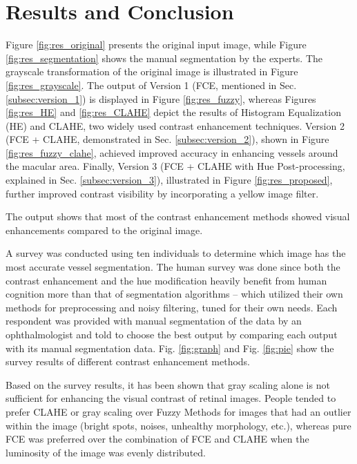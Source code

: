\section{Results and Conclusion}
\label{sec:results}

Figure \ref{fig:res_original} presents the original input image, while Figure \ref{fig:res_segmentation} shows the manual segmentation by the experts. The grayscale transformation of the original image is illustrated in Figure \ref{fig:res_grayscale}. The output of Version 1 (FCE, mentioned in Sec. \ref{subsec:version_1}) is displayed in Figure \ref{fig:res_fuzzy}, whereas Figures \ref{fig:res_HE} and \ref{fig:res_CLAHE} depict the results of Histogram Equalization (HE) and CLAHE, two widely used contrast enhancement techniques. Version 2 (FCE + CLAHE, demonstrated in Sec. \ref{subsec:version_2}), shown in Figure \ref{fig:res_fuzzy_clahe}, achieved improved accuracy in enhancing vessels around the macular area. Finally, Version 3 (FCE + CLAHE with Hue Post-processing, explained in Sec. \ref{subsec:version_3}), illustrated in Figure \ref{fig:res_proposed}, further improved contrast visibility by incorporating a yellow image filter.



The output shows that most of the contrast enhancement methods showed visual enhancements compared to the original image. 

A survey was conducted using ten individuals to determine which image has the most accurate vessel segmentation. The human survey was done since both the contrast enhancement and the hue modification heavily benefit from human cognition more than that of segmentation algorithms – which utilized their own methods for preprocessing and noisy filtering, tuned for their own needs. Each respondent was provided with manual segmentation of the data by an ophthalmologist and told to choose the best output by comparing each output with its manual segmentation data.  Fig. \ref{fig:graph} and Fig. \ref{fig:pie} show the survey results of different contrast enhancement methods.

Based on the survey results, it has been shown that gray scaling alone is not sufficient for enhancing the visual contrast of retinal images. People tended to prefer CLAHE or gray scaling over Fuzzy Methods for images that had an outlier within the image (bright spots, noises, unhealthy morphology, etc.), whereas pure FCE was preferred over the combination of FCE and CLAHE when the luminosity of the image was evenly distributed.

